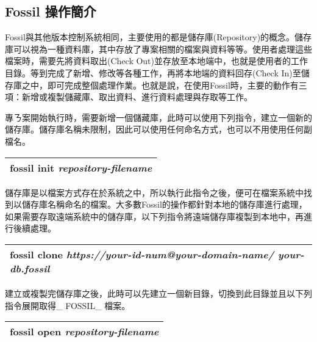 \subsection{Fossil 操作簡介}
\par
\renewcommand{\baselinestretch}{1} %
\twelve \qquad Fossil與其他版本控制系統相同，主要使用的都是儲存庫(Repository)的概念。儲存庫可以視為一種資料庫，其中存放了專案相關的檔案與資料等等。使用者處理這些檔案時，需要先將資料取出(Check Out)並存放至本地端中，也就是使用者的工作目錄。等到完成了新增、修改等各種工作，再將本地端的資料回存(Check In)至儲存庫之中，即可完成整個處理作業。也就是說，在使用Fossil時，主要的動作有三項：新增或複製儲藏庫、取出資料、進行資料處理與存取等工作。
\\
\par
\renewcommand{\baselinestretch}{1} %
\twelve \hspace{0.5em} 專ㄋ案開始執行時，需要新增一個儲藏庫，此時可以使用下列指令，建立一個新的儲存庫。儲存庫名稱未限制，因此可以使用任何命名方式，也可以不用使用任何副檔名。
\par
\begin{center}
\begin{tabular}{||p{15cm}|} %
\hline
\textbf{fossil init} \emph{repository-filename}
\\
\hline
\end{tabular}
\end{center}
\par
\renewcommand{\baselinestretch}{1} %
\twelve \hspace{0.5em} 儲存庫是以檔案方式存在於系統之中，所以執行此指令之後，便可在檔案系統中找到以儲存庫名稱命名的檔案。大多數Fossil的操作都針對本地的儲存庫進行處理，如果需要存取遠端系統中的儲存庫，以下列指令將遠端儲存庫複製到本地中，再進行後續處理。
\par
\begin{center}
\begin{tabular}{||p{15cm}|} %
\hline
\textbf{fossil clone} \emph{https://your-id-num@your-domain-name/ your-db.fossil}
\\
\hline
\end{tabular}
\end{center}
\par
\renewcommand{\baselinestretch}{1} %
\twelve \hspace{0.5em} 建立或複製完儲存庫之後，此時可以先建立一個新目錄，切換到此目錄並且以下列指令展開取得\_ FOSSIL\_ 檔案。
\par
\begin{center}
\begin{tabular}{||p{15cm}|} %
\hline
\textbf{fossil open} \emph{repository-filename}
\\
\hline
\end{tabular}
\end{center}
